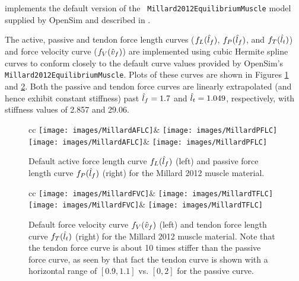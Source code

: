 implements the default version of the {\tt
Millard2012EquilibriumMuscle} model supplied by OpenSim
\cite{delp2007opensim} and described in \cite{millard2013flexing}.

The active, passive and tendon force length curves ($f_L(\hat{l}_f)$,
$f_P(\hat{l}_f)$, and $f_T(\hat{l}_t)$) and force velocity curve ($f_V(\hat{v}_f)$)
are implemented using cubic Hermite spline curves to conform closely
to the default curve values provided by OpenSim's {\tt
Millard2012EquilibriumMuscle}. Plots of these curves are shown in
Figures \ref{MillardCurvesA:fig} and \ref{MillardCurvesB:fig}.  Both
the passive and tendon force curves are linearly extrapolated (and
hence exhibit constant stiffness) past $\hat{l}_f = 1.7$ and
$\hat{l}_t = 1.049$, respectively, with stiffness values of 2.857 and
29.06.

\begin{figure}[ht]
\begin{center}
\begin{tabular}{cc}
   \iflatexml
      \texttt{[image: images/MillardAFLC]}&
      \texttt{[image: images/MillardPFLC]}
   \else
      \texttt{[image: images/MillardAFLC]}&
      \texttt{[image: images/MillardPFLC]}
   \fi
\end{tabular}
\end{center}
\caption{Default active force length curve $f_L(\hat{l}_f)$ (left) and 
passive force length curve $f_P(\hat{l}_f)$ (right) for the Millard 2012
muscle material.}
\label{MillardCurvesA:fig}
\end{figure}

\begin{figure}[ht]
\begin{center}
\begin{tabular}{cc}
   \iflatexml
      \texttt{[image: images/MillardFVC]}&
      \texttt{[image: images/MillardTFLC]}
   \else
      \texttt{[image: images/MillardFVC]}&
      \texttt{[image: images/MillardTFLC]}
   \fi
\end{tabular}
\end{center}
\caption{Default force velocity curve $f_V(\hat{v}_f)$ (left) 
and tendon force length curve $f_T(\hat{l}_t)$ (right) for the Millard 2012
muscle material. Note that the tendon force curve is about 10 times
stiffer than the passive force curve, as seen by that fact the tendon
curve is shown with a horizontal range of $[0.9, 1.1]$ vs. $[0, 2]$
for the passive curve.}
\label{MillardCurvesB:fig}
\end{figure}


